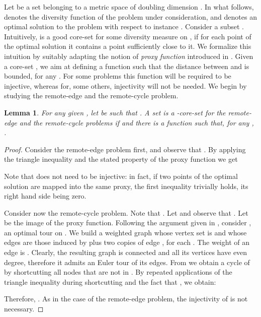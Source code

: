 \documentclass{article}
\newtheorem{lemma}{Lemma}
\begin{document}
Let  be a set belonging to a metric space of doubling dimension
. In what follows,  denotes the diversity
function of the problem under consideration, and  denotes an
optimal solution to the problem with respect to instance .
Consider a subset . Intuitively,  is a good core-set
for some diversity measure on , if for each point of the optimal
solution  it contains a point sufficiently close to it.  We
formalize this intuition by suitably adapting the notion of
\emph{proxy function} introduced in \cite{IndykMMM14}. Given a
core-set , we aim at defining a function
 such that the distance between  and  is
bounded, for any . For some problems this function will be
required to be injective, whereas for, some others, injectivity will not
be needed. We begin by studying the remote-edge and the remote-cycle problem.

\begin{lemma}\label{lem:remote-edge}
  For any given , let  be such that
  . A set  is a
  -core-set for the remote-edge and the remote-cycle problems if
   and there is a function  such that, for any
  , .
\end{lemma}
\begin{proof}
  Consider the remote-edge problem first, and observe that 
  . By
  applying the triangle inequality and the stated property of the proxy 
  function  we get
  
  Note that  does not need to be injective: in fact, if two
  points of the optimal solution are mapped into the same proxy, the
  first inequality trivially holds, its right hand side being zero.

  Consider now the remote-cycle problem.
  Note that . Let  and observe that .
Let  be the image of the proxy
  function. Following the argument given in
  \cite{IndykMMM14,AghamolaeiFZ15}, consider ,
  an optimal tour on . We build a weighted graph  whose vertex
  set is  and whose edges are those induced by
   plus two copies of edge , for
  each . The weight of an edge  is .  Clearly,
  the resulting graph  is connected and all its vertices have even
  degree, therefore it admits an Euler tour  of its edges. From
   we obtain a cycle  of  by shortcutting all nodes that
  are not in . By repeated applications of the triangle inequality
  during shortcutting and the fact that
  , we obtain:
  
  Therefore,
  .
  As in the case of the remote-edge problem, the injectivity of  is not necessary.
\end{proof}
\end{document}

